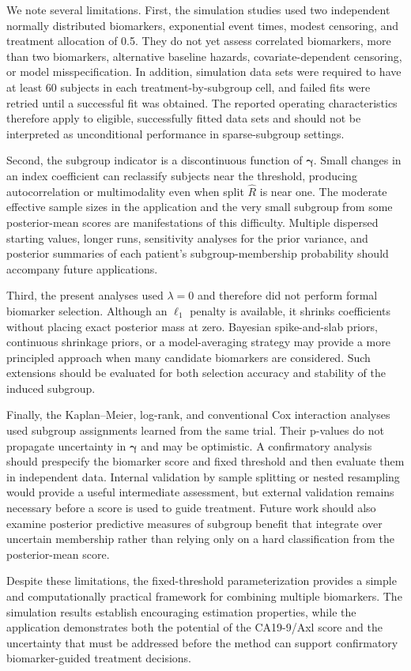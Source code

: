 We note several limitations. First, the simulation studies used two
independent normally distributed biomarkers, exponential event times, modest
censoring, and treatment allocation of 0.5. They do not yet assess correlated
biomarkers, more than two biomarkers, alternative baseline hazards,
covariate-dependent censoring, or model misspecification. In addition,
simulation data sets were required to have at least 60 subjects in each
treatment-by-subgroup cell, and failed fits were retried until a successful
fit was obtained. The reported operating characteristics therefore apply to
eligible, successfully fitted data sets and should not be interpreted as
unconditional performance in sparse-subgroup settings.

Second, the subgroup indicator is a discontinuous function of
$\boldsymbol\gamma$. Small changes in an index coefficient can reclassify
subjects near the threshold, producing autocorrelation or multimodality even
when split $\widehat R$ is near one. The moderate effective sample sizes in
the application and the very small subgroup from some posterior-mean scores
are manifestations of this difficulty. Multiple dispersed starting values,
longer runs, sensitivity analyses for the prior variance, and posterior
summaries of each patient's subgroup-membership probability should accompany
future applications.

Third, the present analyses used $\lambda=0$ and therefore did not perform
formal biomarker selection. Although an $\ell_1$ penalty is available, it
shrinks coefficients without placing exact posterior mass at zero. Bayesian
spike-and-slab priors, continuous shrinkage priors, or a model-averaging
strategy may provide a more principled approach when many candidate
biomarkers are considered. Such extensions should be evaluated for both
selection accuracy and stability of the induced subgroup.

Finally, the Kaplan--Meier, log-rank, and conventional Cox interaction
analyses used subgroup assignments learned from the same trial. Their
p-values do not propagate uncertainty in $\boldsymbol\gamma$ and may be
optimistic. A confirmatory analysis should prespecify the biomarker score and
fixed threshold and then evaluate them in independent data. Internal
validation by sample splitting or nested resampling would provide a useful
intermediate assessment, but external validation remains necessary before a
score is used to guide treatment. Future work should also examine posterior
predictive measures of subgroup benefit that integrate over uncertain
membership rather than relying only on a hard classification from the
posterior-mean score.

Despite these limitations, the fixed-threshold parameterization provides a
simple and computationally practical framework for combining multiple
biomarkers. The simulation results establish encouraging estimation
properties, while the application demonstrates both the potential of the
CA19-9/Axl score and the uncertainty that must be addressed before the method
can support confirmatory biomarker-guided treatment decisions.
